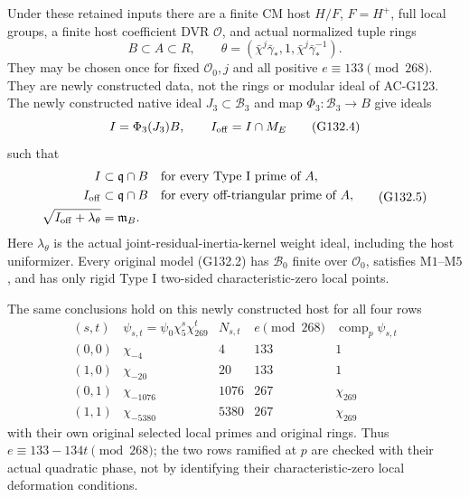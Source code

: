 \begin{theorem}
\label{AC-G132-e133-model}
Under these retained inputs there are a finite CM host \(H/F\),
\(F=H^+\), full local groups, a finite host coefficient DVR
\(\mathcal O\), and actual normalized tuple rings
\[
 B\subset A\subset R,\qquad
 \theta=(\bar\chi^j\bar\gamma_*,1,
                         \bar\chi^j\bar\gamma_*^{-1}).
 \tag{G132.3}
\]
They may be chosen once for fixed \(\mathcal O_0,j\) and all
positive \(e\equiv133\pmod{268}\).  They are newly constructed data,
not the rings or modular ideal of AC-G123.
The newly constructed native ideal \(J_3\subset\mathcal B_3\)
and map \(\Phi_3:\mathcal B_3\to B\) give ideals
\[
 I=\Phi_3(J_3)B,\qquad I_{\rm off}=I\cap M_E
 \tag{G132.4}
\]
such that
\[
 \begin{aligned}
 I&\subset\mathfrak q\cap B
       &&\text{for every Type I prime of }A,\\
 I_{\rm off}&\subset\mathfrak q\cap B
       &&\text{for every off-triangular prime of }A,\\
 \sqrt{I_{\rm off}+\lambda_\theta}&=\mathfrak m_B .
 \end{aligned}
 \tag{G132.5}
\]
Here \(\lambda_\theta\) is the actual joint-residual-inertia-kernel
weight ideal, including the host uniformizer.
Every original model (G132.2) has \(\mathscr B_0\) finite over
\(\mathcal O_0\), satisfies \(\mathrm{M1}\)--\(\mathrm{M5}\), and
has only rigid Type I two-sided characteristic-zero local points.

The same conclusions hold on this newly constructed host for all
four rows
\[
\begin{array}{c|c|r|c|c}
(s,t)&\psi_{s,t}=\psi_0\chi_5^s\chi_{269}^t
 &N_{s,t}&e\pmod{268}&\operatorname{comp}_p\psi_{s,t}\\ \hline
(0,0)&\chi_{-4}&4&133&1\\
(1,0)&\chi_{-20}&20&133&1\\
(0,1)&\chi_{-1076}&1076&267&\chi_{269}\\
(1,1)&\chi_{-5380}&5380&267&\chi_{269}
\end{array}
\tag{G132.6}
\]
with their own original selected local primes and original rings.
Thus \(e\equiv133-134t\pmod{268}\); the two rows ramified at \(p\)
are checked with their actual quadratic phase, not by identifying
their characteristic-zero local deformation conditions.


\end{theorem}
